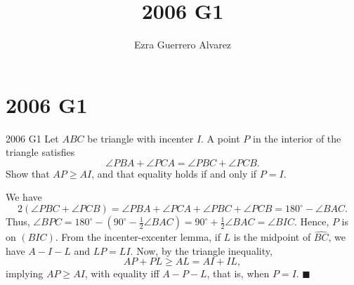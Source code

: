 \documentclass[14pt]{article}
\title{2006 G1}
\author{Ezra Guerrero Alvarez}
\begin{document}
\maketitle
	
\section*{2006 G1}

\begin{statement}{2006 G1}
	Let $ABC$ be triangle with incenter $I$. A point $P$ in the interior of the triangle satisfies
	\[ \angle PBA+\angle PCA = \angle PBC+\angle PCB. \]
	Show that $AP \geq AI$, and that equality holds if and only if $P=I$.
\end{statement}
We have 
\[2(\angle PBC + \angle PCB) = \angle PBA + \angle PCA + \angle PBC + \angle PCB = 180^\circ-\angle BAC. \]
Thus, $\angle BPC = 180^\circ-(90^\circ-\frac12\angle BAC) = 90^\circ+\frac12\angle BAC=\angle BIC$. Hence, $P$ is on $(BIC)$. From the incenter-excenter lemma, if $L$ is the midpoint of $\widehat{BC}$, we have $A-I-L$ and $LP=LI$. Now, by the triangle inequality,
\[ AP + PL\ge AL = AI+IL, \]
implying $AP\ge AI$, with equality iff $A-P-L$, that is, when $P=I$. $\blacksquare$
	
\end{document}
